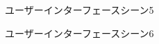 \begin{figure}[htbp]
    \begin{center}
    \end{center}
    \caption{ユーザーインターフェースシーン5}
    \label{fig:seen5}
\end{figure}

\begin{figure}[htbp]
    \begin{center}
    \end{center}
    \caption{ユーザーインターフェースシーン6}
    \label{fig:seen6}
\end{figure}

